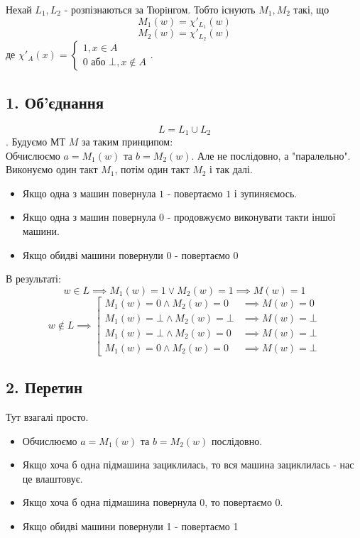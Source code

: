 \documentclass[11pt, a4paper]{article} %
\begin{document}
Нехай $L_1, L_2$ - розпізнаються за Тюрiнгом.
Тобто існують $M_1, M_2$ такі, що
$$M_1(w) = \chi'_{L_1}(w)$$
$$M_2(w) = \chi'_{L_2}(w)$$
де $\chi'_A(x) = \begin{cases}
    1, x\in A\\
    0 \text{ або } \bot, x\notin A
\end{cases}$.

\subsection*{1. Об'єднання}
$$L = L_1 \cup L_2$$.
Будуємо МТ $M$ за таким принципом:\\
Обчислюємо $a=M_1(w)$ та $b=M_2(w)$. 
Але не послідовно, а "паралельно". Виконуємо один такт $M_1$, потім один такт $M_2$ і так далі.
\begin{itemize}
    \item Якщо одна з машин повернула $1$ - повертаємо $1$ і зупиняємось.
    \item Якщо одна з машин повернула $0$ - продовжуємо виконувати такти іншої машини.
    \item Якщо обидві машини повернули $0$ - повертаємо $0$
\end{itemize}
В результаті: 
$$w \in L \implies M_1(w) = 1 \vee M_2(w) = 1 \implies M(w) = 1$$
$$w \notin L \implies \left[ \begin{matrix}
    M_1(w) = 0 \wedge M_2(w) = 0 & \implies M(w) = 0\\
    M_1(w) = \bot \wedge M_2(w) = \bot & \implies M(w) = \bot\\
    M_1(w) = \bot \wedge M_2(w) = 0 & \implies M(w) = \bot\\
    M_1(w) = 0 \wedge M_2(w) = 0 & \implies M(w) = \bot
\end{matrix} \right.$$
\qedsymbol

\subsection*{2. Перетин}
Тут взагалі просто. 
\begin{itemize}
    \item Обчислюємо $a=M_1(w)$ та $b=M_2(w)$ послідовно. 
    \item Якщо хоча б одна підмашина зациклилась, то вся машина зациклилась - нас це влаштовує.
    \item Якщо хоча б одна підмашина повернула 0, то повертаємо 0.  
    \item Якщо обидві машини повернули 1 - повертаємо 1
\end{itemize}
\qedsymbol
\end{document}
